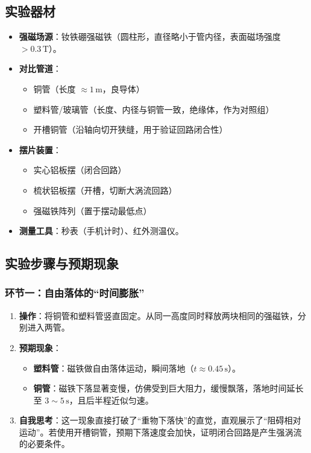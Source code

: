 \documentclass[a4paper,12pt]{article}
\begin{document}
\subsection{实验器材}
\begin{itemize}
    \item \textbf{强磁场源}：钕铁硼强磁铁（圆柱形，直径略小于管内径，表面磁场强度 $>0.3\,\text{T}$）。
    \item \textbf{对比管道}：
    \begin{itemize}
        \item 铜管（长度 $\approx 1\,\text{m}$，良导体）
        \item 塑料管/玻璃管（长度、内径与铜管一致，绝缘体，作为对照组）
        \item 开槽铜管（沿轴向切开狭缝，用于验证回路闭合性）
    \end{itemize}
    \item \textbf{摆片装置}：
    \begin{itemize}
        \item 实心铝板摆（闭合回路）
        \item 梳状铝板摆（开槽，切断大涡流回路）
        \item 强磁铁阵列（置于摆动最低点）
    \end{itemize}
    \item \textbf{测量工具}：秒表（手机计时）、红外测温仪。
\end{itemize}

\subsection{实验步骤与预期现象}

\subsubsection{环节一：自由落体的“时间膨胀”}
\begin{enumerate}
    \item \textbf{操作}：将铜管和塑料管竖直固定。从同一高度同时释放两块相同的强磁铁，分别进入两管。
    \item \textbf{预期现象}：
    \begin{itemize}
        \item \textbf{塑料管}：磁铁做自由落体运动，瞬间落地（$t \approx 0.45\,\text{s}$）。
        \item \textbf{铜管}：磁铁下落显著变慢，仿佛受到巨大阻力，缓慢飘落，落地时间延长至 $3\sim5\,\text{s}$，且后半程近似匀速。
    \end{itemize}
    \item \textbf{自我思考}：这一现象直接打破了“重物下落快”的直觉，直观展示了“阻碍相对运动”。若使用开槽铜管，预期下落速度会加快，证明闭合回路是产生强涡流的必要条件。
\end{enumerate}
\end{document}
